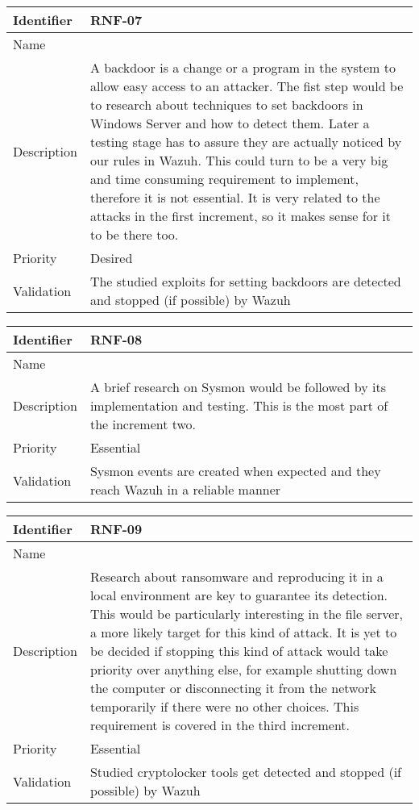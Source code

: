\begin{table}[H]
	\begin{tabularx}{\textwidth}{|l|X|}
		\hline
		\rowcolor{gray!30}
		Identifier & \textbf{RNF-07} \\ \hline
		Name & \RNFsiete \\ \hline
		Description & A backdoor is a change or a program in the system to allow easy access to an attacker. The fist step would be to research about techniques to set backdoors in Windows Server and how to detect them. Later a testing stage has to assure they are actually noticed by our rules in Wazuh. This could turn to be a very big and time consuming requirement to implement, therefore it is not essential. It is very related to the attacks in the first increment, so it makes sense for it to be there too.  \\ \hline
		Priority & Desired \\ \hline
		Validation & The studied exploits for setting backdoors are detected and stopped (if possible) by Wazuh  \\ \hline
	\end{tabularx}
\end{table}
\begin{table}[H]
	\begin{tabularx}{\textwidth}{|l|X|}
		\hline
		\rowcolor{gray!30}
		Identifier & \textbf{RNF-08} \\ \hline
		Name & \RNFocho \\ \hline
		Description & A brief research on Sysmon would be followed by its implementation and testing. This is the most part of the increment two. \\ \hline
		Priority & Essential \\ \hline
		Validation & Sysmon events are created when expected and they reach Wazuh in a reliable manner \\ \hline
	\end{tabularx}
\end{table}
\begin{table}[H]
	\begin{tabularx}{\textwidth}{|l|X|}
		\hline
		\rowcolor{gray!30}
		Identifier & \textbf{RNF-09} \\ \hline
		Name & \RNFnueve \\ \hline
		Description & Research about ransomware and reproducing it in a local environment are key to guarantee its detection. This would be particularly interesting in the file server, a more likely target for this kind of attack. It is yet to be decided if stopping this kind of attack would take priority over anything else, for example shutting down the computer or disconnecting it from the network temporarily if there were no other choices. This requirement is covered in the third increment. \\ \hline
		Priority & Essential \\ \hline
		Validation & Studied cryptolocker tools get detected and stopped (if possible) by Wazuh  \\ \hline
	\end{tabularx}
\end{table}
